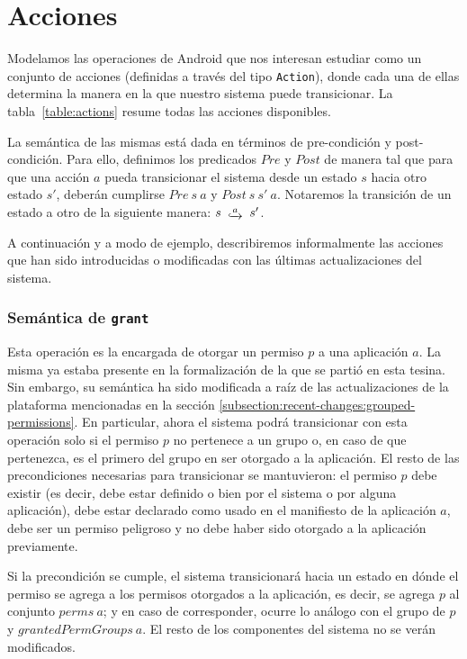 \section{Acciones}
Modelamos las operaciones de Android que nos interesan estudiar como un conjunto de acciones
(definidas a través del tipo \texttt{Action}), donde cada una de ellas determina la manera en la que
nuestro sistema puede transicionar.  La tabla~\ref{table:actions} resume todas las acciones
disponibles.

La semántica de las mismas está dada en términos de pre-condición y post-condición. Para ello,
definimos los predicados $Pre$ y $Post$ de manera tal que para que una acción $a$ pueda transicionar
el sistema desde un estado $s$ hacia otro estado $s'$, deberán cumplirse $Pre\ s\ a$ y $Post\ s\ s'\
    a$. Notaremos la transición de un estado a otro de la siguiente manera: $s\ \step{a}\ s'$.

A continuación y a modo de ejemplo, describiremos informalmente las acciones que han sido introducidas
o modificadas con las últimas actualizaciones del sistema.

\subsubsection{Semántica de \texttt{grant}}

Esta operación es la encargada de otorgar un permiso $p$ a una aplicación $a$. La misma ya estaba
presente en la formalización de la que se partió en esta tesina. Sin embargo, su semántica ha sido
modificada a raíz de las actualizaciones de la plataforma mencionadas en la sección
\ref{subsection:recent-changes:grouped-permissions}. En particular, ahora el sistema podrá
transicionar con esta operación solo si  el permiso $p$ no pertenece a un grupo o, en caso de que
pertenezca, es el primero del grupo en ser otorgado a la aplicación. El resto de las precondiciones
necesarias para transicionar se mantuvieron: el permiso $p$ debe existir (es decir, debe estar
definido o bien por el sistema o por alguna aplicación), debe estar declarado como usado en el
manifiesto de la aplicación $a$, debe ser un permiso peligroso y no debe haber sido otorgado a la
aplicación previamente.

Si la precondición se cumple, el sistema transicionará hacia un estado en dónde el permiso se agrega a
los permisos otorgados a la aplicación, es decir, se agrega $p$ al conjunto $perms\ a$; y en caso de
corresponder, ocurre lo análogo con el grupo de $p$ y $grantedPermGroups\ a$. El resto de los
componentes del sistema no se verán modificados.

